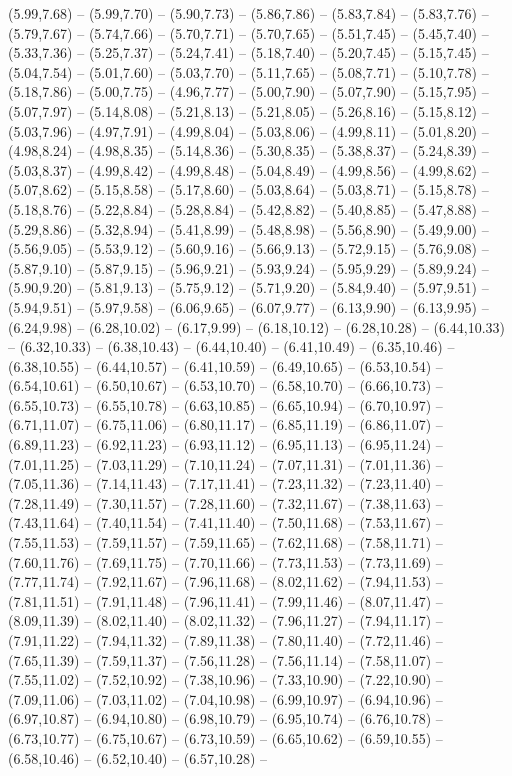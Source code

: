 \expandafter\def\csname geo:gebiet:NOR\endcsname{
  (5.99,7.68) -- (5.99,7.70) -- (5.90,7.73) -- (5.86,7.86) -- (5.83,7.84) -- (5.83,7.76) -- (5.79,7.67) -- (5.74,7.66) -- (5.70,7.71) -- (5.70,7.65) -- (5.51,7.45) -- (5.45,7.40) -- (5.33,7.36) -- (5.25,7.37) -- (5.24,7.41) -- (5.18,7.40) -- (5.20,7.45) -- (5.15,7.45) -- (5.04,7.54) -- (5.01,7.60) -- (5.03,7.70) -- (5.11,7.65) -- (5.08,7.71) -- (5.10,7.78) -- (5.18,7.86) -- (5.00,7.75) -- (4.96,7.77) -- (5.00,7.90) -- (5.07,7.90) -- (5.15,7.95) -- (5.07,7.97) -- (5.14,8.08) -- (5.21,8.13) -- (5.21,8.05) -- (5.26,8.16) -- (5.15,8.12) -- (5.03,7.96) -- (4.97,7.91) -- (4.99,8.04) -- (5.03,8.06) -- (4.99,8.11) -- (5.01,8.20) -- (4.98,8.24) -- (4.98,8.35) -- (5.14,8.36) -- (5.30,8.35) -- (5.38,8.37) -- (5.24,8.39) -- (5.03,8.37) -- (4.99,8.42) -- (4.99,8.48) -- (5.04,8.49) -- (4.99,8.56) -- (4.99,8.62) -- (5.07,8.62) -- (5.15,8.58) -- (5.17,8.60) -- (5.03,8.64) -- (5.03,8.71) -- (5.15,8.78) -- (5.18,8.76) -- (5.22,8.84) -- (5.28,8.84) -- (5.42,8.82) -- (5.40,8.85) -- (5.47,8.88) -- (5.29,8.86) -- (5.32,8.94) -- (5.41,8.99) -- (5.48,8.98) -- (5.56,8.90) -- (5.49,9.00) -- (5.56,9.05) -- (5.53,9.12) -- (5.60,9.16) -- (5.66,9.13) -- (5.72,9.15) -- (5.76,9.08) -- (5.87,9.10) -- (5.87,9.15) -- (5.96,9.21) -- (5.93,9.24) -- (5.95,9.29) -- (5.89,9.24) -- (5.90,9.20) -- (5.81,9.13) -- (5.75,9.12) -- (5.71,9.20) -- (5.84,9.40) -- (5.97,9.51) -- (5.94,9.51) -- (5.97,9.58) -- (6.06,9.65) -- (6.07,9.77) -- (6.13,9.90) -- (6.13,9.95) -- (6.24,9.98) -- (6.28,10.02) -- (6.17,9.99) -- (6.18,10.12) -- (6.28,10.28) -- (6.44,10.33) -- (6.32,10.33) -- (6.38,10.43) -- (6.44,10.40) -- (6.41,10.49) -- (6.35,10.46) -- (6.38,10.55) -- (6.44,10.57) -- (6.41,10.59) -- (6.49,10.65) -- (6.53,10.54) -- (6.54,10.61) -- (6.50,10.67) -- (6.53,10.70) -- (6.58,10.70) -- (6.66,10.73) -- (6.55,10.73) -- (6.55,10.78) -- (6.63,10.85) -- (6.65,10.94) -- (6.70,10.97) -- (6.71,11.07) -- (6.75,11.06) -- (6.80,11.17) -- (6.85,11.19) -- (6.86,11.07) -- (6.89,11.23) -- (6.92,11.23) -- (6.93,11.12) -- (6.95,11.13) -- (6.95,11.24) -- (7.01,11.25) -- (7.03,11.29) -- (7.10,11.24) -- (7.07,11.31) -- (7.01,11.36) -- (7.05,11.36) -- (7.14,11.43) -- (7.17,11.41) -- (7.23,11.32) -- (7.23,11.40) -- (7.28,11.49) -- (7.30,11.57) -- (7.28,11.60) -- (7.32,11.67) -- (7.38,11.63) -- (7.43,11.64) -- (7.40,11.54) -- (7.41,11.40) -- (7.50,11.68) -- (7.53,11.67) -- (7.55,11.53) -- (7.59,11.57) -- (7.59,11.65) -- (7.62,11.68) -- (7.58,11.71) -- (7.60,11.76) -- (7.69,11.75) -- (7.70,11.66) -- (7.73,11.53) -- (7.73,11.69) -- (7.77,11.74) -- (7.92,11.67) -- (7.96,11.68) -- (8.02,11.62) -- (7.94,11.53) -- (7.81,11.51) -- (7.91,11.48) -- (7.96,11.41) -- (7.99,11.46) -- (8.07,11.47) -- (8.09,11.39) -- (8.02,11.40) -- (8.02,11.32) -- (7.96,11.27) -- (7.94,11.17) -- (7.91,11.22) -- (7.94,11.32) -- (7.89,11.38) -- (7.80,11.40) -- (7.72,11.46) -- (7.65,11.39) -- (7.59,11.37) -- (7.56,11.28) -- (7.56,11.14) -- (7.58,11.07) -- (7.55,11.02) -- (7.52,10.92) -- (7.38,10.96) -- (7.33,10.90) -- (7.22,10.90) -- (7.09,11.06) -- (7.03,11.02) -- (7.04,10.98) -- (6.99,10.97) -- (6.94,10.96) -- (6.97,10.87) -- (6.94,10.80) -- (6.98,10.79) -- (6.95,10.74) -- (6.76,10.78) -- (6.73,10.77) -- (6.75,10.67) -- (6.73,10.59) -- (6.65,10.62) -- (6.59,10.55) -- (6.58,10.46) -- (6.52,10.40) -- (6.57,10.28) -- }
